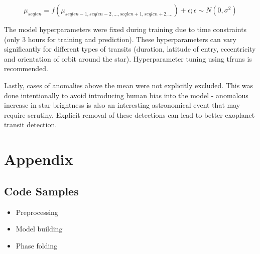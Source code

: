 \documentclass[%
aip,
amsmath,amssymb,
reprint,%
]{revtex4-1}
\begin{document}
$$\mu_{seqlen} = f(\mu_{seqlen-1,seqlen-2, ..., seqlen+1, seqlen+2, ...}) + \epsilon; \epsilon \sim N(0, \sigma^2)$$

The model hyperparameters were fixed during training due to time constraints (only 3 hours for training and prediction). These hyperparameters can vary significantly for different types of transits (duration, latitude of entry, eccentricity and orientation of orbit around the star). Hyperparameter tuning using tfruns is recommended.

Lastly, cases of anomalies above the mean were not explicitly excluded. This was done intentionally to avoid introducing human bias into the model - anomalous increase in star brightness is also an interesting astronomical event that may require scrutiny. Explicit removal of these detections can lead to better exoplanet transit detection.

\vspace{140 mm}
\section*{Appendix}

\subsection{Code Samples}

\begin{itemize}
\item Preprocessing
\end{itemize}



\begin{itemize}
\item Model building
\end{itemize}




\begin{itemize}
\item Phase folding
\end{itemize}


\end{document}
